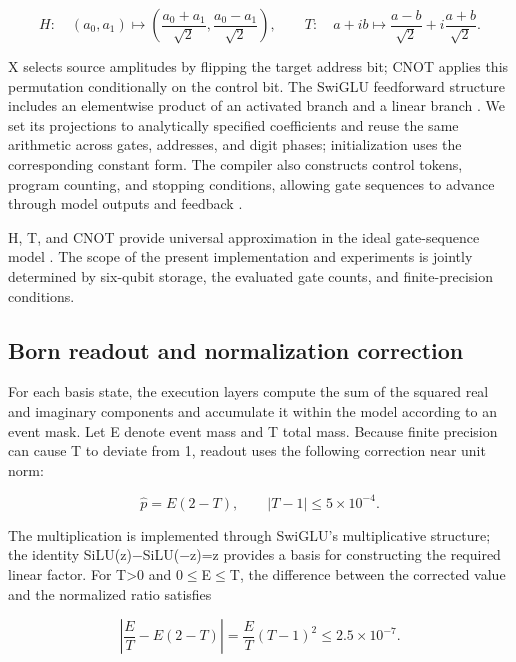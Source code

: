 \documentclass[11pt,a4paper]{article}
\begin{document}
\begin{equation}
H:\quad (a_0,a_1)\mapsto\left(\frac{a_0+a_1}{\sqrt2},\frac{a_0-a_1}{\sqrt2}\right),\qquad
T:\quad a+ib\mapsto\frac{a-b}{\sqrt2}+i\frac{a+b}{\sqrt2}.
\end{equation}

X selects source amplitudes by flipping the target address bit; CNOT applies this permutation conditionally on the control bit. The SwiGLU feedforward structure includes an elementwise product of an activated branch and a linear branch \cite{ref23}. We set its projections to analytically specified coefficients and reuse the same arithmetic across gates, addresses, and digit phases; initialization uses the corresponding constant form. The compiler also constructs control tokens, program counting, and stopping conditions, allowing gate sequences to advance through model outputs and feedback \cite{ref22}.

H, T, and CNOT provide universal approximation in the ideal gate-sequence model \cite{ref24}. The scope of the present implementation and experiments is jointly determined by six-qubit storage, the evaluated gate counts, and finite-precision conditions.

\subsection{Born readout and normalization correction}

For each basis state, the execution layers compute the sum of the squared real and imaginary components and accumulate it within the model according to an event mask. Let E denote event mass and T total mass. Because finite precision can cause T to deviate from 1, readout uses the following correction near unit norm:

\begin{equation}
\widehat p=E(2-T),\qquad |T-1|\leq 5\times10^{-4}.
\end{equation}

The multiplication is implemented through SwiGLU's multiplicative structure; the identity SiLU(z)\ensuremath{-}SiLU(\ensuremath{-}z)=z provides a basis for constructing the required linear factor. For T\textgreater0 and 0\ensuremath{\leq}E\ensuremath{\leq}T, the difference between the corrected value and the normalized ratio satisfies

\begin{equation}
\left|\frac ET-E(2-T)\right|=\frac E T(T-1)^2\leq 2.5\times10^{-7}.
\end{equation}
\end{document}
